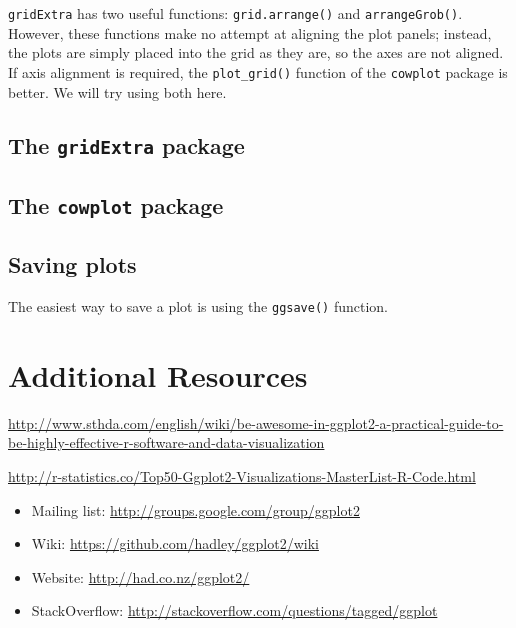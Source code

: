 \documentclass[
]{book}
\providecommand{\tightlist}{%
  \setlength{\itemsep}{0pt}\setlength{\parskip}{0pt}}
\begin{document}
\texttt{gridExtra} has two useful functions: \texttt{grid.arrange()} and \texttt{arrangeGrob()}. However, these functions make no attempt at aligning the plot panels; instead, the plots are simply placed into the grid as they are, so the axes are not aligned. If axis alignment is required, the \texttt{plot\_grid()} function of the \texttt{cowplot} package is better. We will try using both here.

\hypertarget{the-gridextra-package}{%
\subsection{\texorpdfstring{The \texttt{gridExtra} package}{The gridExtra package}}\label{the-gridextra-package}}

\hypertarget{the-cowplot-package}{%
\subsection{\texorpdfstring{The \texttt{cowplot} package}{The cowplot package}}\label{the-cowplot-package}}

\hypertarget{saving-plots}{%
\subsection{Saving plots}\label{saving-plots}}

The easiest way to save a plot is using the \texttt{ggsave()} function.

\hypertarget{additional-resources}{%
\section{Additional Resources}\label{additional-resources}}

\url{http://www.sthda.com/english/wiki/be-awesome-in-ggplot2-a-practical-guide-to-be-highly-effective-r-software-and-data-visualization}

\url{http://r-statistics.co/Top50-Ggplot2-Visualizations-MasterList-R-Code.html}

\begin{itemize}
\tightlist
\item
  Mailing list: \url{http://groups.google.com/group/ggplot2}
\item
  Wiki: \url{https://github.com/hadley/ggplot2/wiki}
\item
  Website: \url{http://had.co.nz/ggplot2/}
\item
  StackOverflow: \url{http://stackoverflow.com/questions/tagged/ggplot}
\end{itemize}
\end{document}
